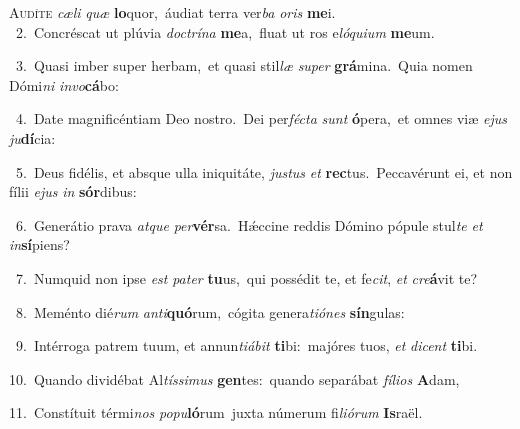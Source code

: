 \lettrine{\initial\textcolor{\initialcolor}{A}}{udíte} \textit{cæ}\-\textit{li} \textit{quæ} \textbf{lo}\-quor,~\star áudiat terra ver\textit{ba} \textit{o}\-\textit{ris} \textbf{me}\-i.\\
{\numbfont\textcolor{\numbcolor}{~2.}}~Concréscat ut plúvia \textit{doc}\-\textit{trí}\textit{na} \textbf{me}\-a,~\star fluat ut ros e\-\textit{ló}\-\textit{qui}\textit{um} \textbf{me}\-um.\par
{\numbfont\textcolor{\numbcolor}{~3.}}~Quasi imber super herbam,~\dagger et quasi stil\textit{læ} \textit{su}\-\textit{per} \textbf{grá}\-mina.~\star Quia nomen Dómi\textit{ni} \textit{in}\-\textit{vo}\textbf{cá}bo:\par
{\numbfont\textcolor{\numbcolor}{~4.}}~Date magnificéntiam Deo nostro.~\dagger Dei per\-\textit{féc}\-\textit{ta} \textit{sunt} \textbf{ó}\-pera,~\star et omnes viæ \textit{e}\-\textit{jus} \textit{ju}\-\textbf{dí}cia:\par
{\numbfont\textcolor{\numbcolor}{~5.}}~Deus fidélis, et absque ulla iniquitáte, \textit{jus}\-\textit{tus} \textit{et} \textbf{rec}\-tus.~\star Peccavérunt ei, et non fílii \textit{e}\-\textit{jus} \textit{in} \textbf{sór}\-dibus:\par
{\numbfont\textcolor{\numbcolor}{~6.}}~Generátio prava \textit{at}\-\textit{que} \textit{per}\-\textbf{vér}sa.~\star Hǽccine reddis Dómino pópule stul\textit{te} \textit{et} \textit{in}\-\textbf{sí}piens?\par
{\numbfont\textcolor{\numbcolor}{~7.}}~Numquid non ipse \textit{est} \textit{pa}\-\textit{ter} \textbf{tu}\-us,~\star qui possédit te, et fe\-\textit{cit}\-, \textit{et} \textit{cre}\-\textbf{á}vit te?\par
{\numbfont\textcolor{\numbcolor}{~8.}}~Meménto dié\textit{rum} \textit{an}\-\textit{ti}\textbf{quó}rum,~\star cógita genera\-\textit{ti}\-\textit{ó}\textit{nes} \textbf{sín}\-gulas:\par
{\numbfont\textcolor{\numbcolor}{~9.}}~Intérroga patrem tuum, et annun\-\textit{ti}\-\textit{á}\textit{bit} \textbf{ti}\-bi:~\star majóres tuos, \textit{et} \textit{di}\-\textit{cent} \textbf{ti}\-bi.\par
{\numbfont\textcolor{\numbcolor}{10.}}~Quando dividébat Al\-\textit{tís}\-\textit{si}\textit{mus} \textbf{gen}\-tes:~\star quando separábat \textit{fí}\-\textit{li}\textit{os} \textbf{A}\-dam,\par
{\numbfont\textcolor{\numbcolor}{11.}}~Constítuit térmi\textit{nos} \textit{po}\-\textit{pu}\textbf{ló}rum~\star juxta númerum fi\-\textit{li}\-\textit{ó}\textit{rum} \textbf{Is}\-raël.\par
